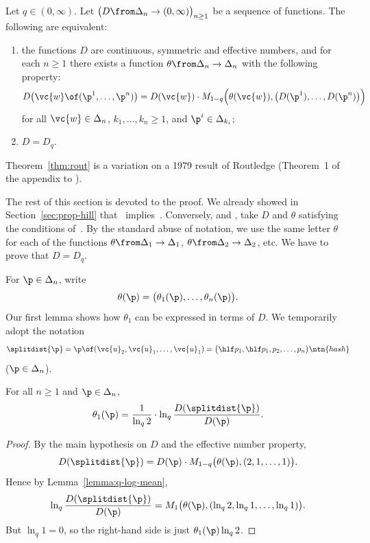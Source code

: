 \begin{thm}
% 
Let $q \in (0, \infty)$.  Let $\bigl( D \from \Delta_n \to (0, \infty)
\bigr)_{n \geq 1}$ be a sequence of functions.  The following are
equivalent: 
% 
\begin{enumerate}
\item
{}
the functions $D$ are continuous, symmetric and effective numbers, and for
each $n \geq 1$ there exists a function $\theta \from \Delta_n \to
\Delta_n$ with the following property: 
\[
D \bigl( \vc{w} \of (\p^1, \ldots, \p^n) \bigr)
=
D(\vc{w}) \cdot
M_{1 - q} \Bigl(
\theta(\vc{w}), \bigl(D(\p^1), \ldots, D(\p^n)\bigr)
\Bigr)
\]
for all $\vc{w} \in \Delta_n$, $k_1, \ldots, k_n \geq 1$, and $\p^i \in
\Delta_{k_i}$;

\item
{}
$D = D_q$.
\end{enumerate}
\end{thm}

Theorem~\ref{thm:rout} is a variation on a 1979 result of
Routledge%
%
%
(Theorem~1 of the appendix to \cite{Rout}).

The rest of this section is devoted to the proof.  We already showed in
Section~\ref{sec:prop-hill} that~
implies~.  Conversely, and , take $D$ and $\theta$ satisfying the conditions
of~.  By the standard abuse of notation, we use the
same letter $\theta$ for each of the functions $\theta \from \Delta_1 \to
\Delta_1$, $\theta \from \Delta_2 \to \Delta_2$, etc.  We have to prove
that $D = D_q$.

For $\p \in \Delta_n$, write
\[
\theta(\p) = \bigl( \theta_1(\p), \ldots, \theta_n(\p) \bigr).
\]
Our first lemma shows how $\theta_1$ can be expressed in terms of $D$.  We
temporarily adopt the notation
% 
\[
\splitdist{\p}  
=
\p \of (\vc{u}_2, \vc{u}_1, \ldots, \vc{u}_1)   
=
\bigl( \hlf p_1, \hlf p_1, p_2, \ldots, p_n \bigr)
\ntn{hash}
\]
($\p \in \Delta_n$).

\begin{lemma}
For all $n \geq 1$ and $\p \in \Delta_n$,
\[
\theta_1(\p)
=
\frac{1}{\ln_q 2} \cdot \ln_q \frac{D(\splitdist{\p})}{D(\p)}.
\]
\end{lemma}

\begin{proof}
By the main hypothesis on $D$ and the effective number property,
\[
D(\splitdist{\p}) 
=
D(\p) \cdot M_{1 - q}\bigl( \theta(\p), (2, 1, \ldots, 1) \bigr).
\]
Hence by Lemma~\ref{lemma:q-log-mean},
\[
\ln_q \frac{D(\splitdist{\p})}{D(\p)} 
=
M_1 \bigl( \theta(\p), (\ln_q 2, \ln_q 1, \ldots, \ln_q 1) \bigr).
\]
But $\ln_q 1 = 0$, so the right-hand side is just $\theta_1(\p) \ln_q 2$.
\end{proof}

